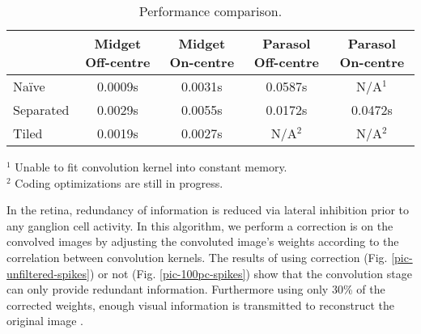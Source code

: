 \begin{table}
  \begin{center}
      \caption{Performance comparison.}
      \bgroup
      \def\arraystretch{1.2}
      \begin{tabular}{l c c c c}
        &
        \begin{minipage}{1.2cm}Midget Off-centre\vspace*{0.05cm}\end{minipage} & 
        \begin{minipage}{1.2cm}Midget On-centre\vspace*{0.05cm}\end{minipage}& 
        \begin{minipage}{1.2cm}Parasol Off-centre\vspace*{0.05cm}\end{minipage}& 
        \begin{minipage}{1.2cm}Parasol On-centre\vspace*{0.05cm}\end{minipage}\\
        \hline 
        \vspace*{0.1cm}
        Naïve     & 0.0009s & 0.0031s & 0.0587s & N/A$^1$ \\ 
        Separated & 0.0029s & 0.0055s & 0.0172s & 0.0472s \\ 
        Tiled     & 0.0019s & 0.0027s & N/A$^2$ & N/A$^2$\\
      \end{tabular} 
      \egroup

  {
    \footnotesize $^1$ Unable to fit convolution kernel into constant memory.\\
                  $^2$ Coding optimizations are still in progress.
  }
  \end{center}
\end{table}


In the retina, redundancy of information is reduced via lateral inhibition 
prior to any ganglion cell activity. In this algorithm, we perform a correction 
is on the convolved images by adjusting the convoluted image's weights 
according to the correlation between convolution kernels. The results of using
correction (Fig. \ref{pic-unfiltered-spikes}) or not (Fig. 
\ref{pic-100pc-spikes}) show that the convolution stage can only provide 
redundant information. Furthermore using only 30\% of the corrected weights, 
enough visual information is transmitted to reconstruct the
original image \cite{basab-model}.

